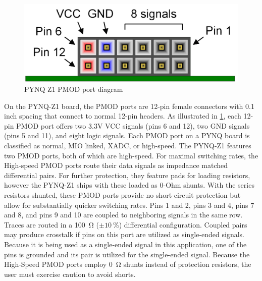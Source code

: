\begin{figure}[htbp]
	\centering
	\includegraphics[width=.8\textwidth]{Figures/4_pynq-z1-pmod.pdf}
	\caption[PYNQ Z1 PMOD port diagram]{PYNQ Z1 PMOD port diagram \cite{pynqrm}}
	\label{fig:4_controlsystem_pynq_z1_pmod}
\end{figure}

On the PYNQ-Z1 board, the PMOD ports are 12-pin female connectors with 0.1 inch spacing that connect to normal 12-pin headers. As illustrated in \cref{fig:4_controlsystem_pynq_z1_pmod}, each 12-pin PMOD port offers two 3.3V VCC signals (pins 6 and 12), two GND signals (pins 5 and 11), and eight logic signals. Each PMOD port on a PYNQ board is classified as normal, MIO linked, XADC, or high-speed. The PYNQ-Z1 features two PMOD ports, both of which are high-speed. For maximal switching rates, the High-speed PMOD ports route their data signals as impedance matched differential pairs. For further protection, they feature pads for loading resistors, however the PYNQ-Z1 ships with these loaded as 0-Ohm shunts. With the series resistors shunted, these PMOD ports provide no short-circuit protection but allow for substantially quicker switching rates. Pins 1 and 2, pins 3 and 4, pins 7 and 8, and pins 9 and 10 are coupled to neighboring signals in the same row. Traces are routed in a \qty{100}{\ohm} ($\pm\qty{10}{\percent}$) differential configuration. Coupled pairs may produce crosstalk if pins on this port are utilized as single-ended signals. Because it is being used as a single-ended signal in this application, one of the pins is grounded and its pair is utilized for the single-ended signal. Because the High-Speed PMOD ports employ \qty{0}{\ohm} shunts instead of protection resistors, the user must exercise caution to avoid shorts.

